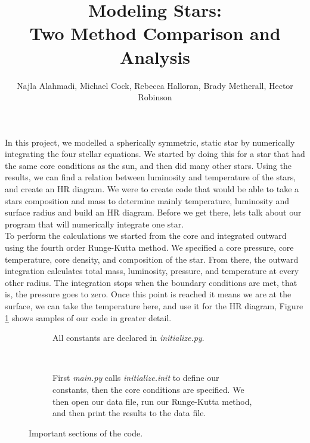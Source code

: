 \documentclass[10pt]{article}
\title{Modeling Stars: \\ Two Method Comparison and Analysis}
\author{Najla Alahmadi, Michael Cock, Rebecca Halloran, Brady Metherall, Hector Robinson}
\begin{document}
\maketitle

\lstset{style=mystyle}

In this project, we modelled a spherically symmetric, static star by numerically integrating the four stellar equations. We started by doing this for a star that had the same core conditions as the sun, and then did many other stars. Using the results, we can find a relation between luminosity and temperature of the stars, and create an HR diagram. We were to create code that would be able to take a stars composition and mass to determine mainly temperature, luminosity and surface radius and build an HR diagram. Before we get there, lets talk about our program that will numerically integrate one star. \\

To perform the calculations we started from the core and integrated outward using the fourth order Runge-Kutta method. We specified a core pressure, core temperature, core density, and composition of the star. From there, the outward integration calculates total mass, luminosity, pressure, and temperature at every other radius. The integration stops when the boundary conditions are met, that is, the pressure goes to zero. Once this point is reached it means we are at the surface, we can take the temperature here, and use it for the HR diagram, Figure \ref{fig:code} shows samples of our code in greater detail. \\

\begin{figure}[htbp]
 \begin{subfigure}{\textwidth}
  
  \caption{All constants are declared in \emph{initialize.py}.}
 \end{subfigure} \\
 \begin{subfigure}{\textwidth}
  
  
  
  \caption{First \emph{main.py} calls \emph{initialize.init} to define our constants, then the core conditions are specified. We then open our data file, run our Runge-Kutta method, and then print the results to the data file.}
 \end{subfigure}
 \caption{Important sections of the code.}
 \label{fig:code}
\end{figure}
\end{document}
